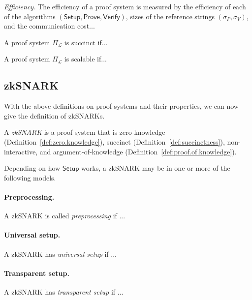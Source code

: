 \documentclass[acmtog]{acmart}
\newcommand{\cL}{\mathcal{L}}
\newcommand{\Setup}{\mathsf{Setup}}
\newcommand{\Prove}{\mathsf{Prove}}
\newcommand{\Verify}{\mathsf{Verify}}
\newcommand{\PiL}{\Pi_{\cL}}
\begin{document}
\emph{Efficiency.} The efficiency of a proof system is measured by the efficiency of each of the algorithms $(\Setup,\Prove,\Verify)$, sizes of the reference strings $(\sigma_P,\sigma_V)$, and the communication cost...

\begin{definition}[Succinctness]
\label{def:succinctness}
A proof system $\PiL$ is succinct if...
\end{definition}

\begin{definition}[Scalability]
\label{def:scalability}
A proof system $\PiL$ is scalable if...
\end{definition}

\subsection{zkSNARK}

With the above definitions on proof systems and their properties, we can now give the definition of zkSNARKs.

\begin{definition}[zkSNARK]
A \emph{zkSNARK} is a proof system that is zero-knowledge (Definition~\ref{def:zero.knowledge}), succinct (Definition~\ref{def:succinctness}), non-interactive, and argument-of-knowledge (Definition~\ref{def:proof.of.knowledge}).
\end{definition}

Depending on how $\Setup$ works, a zkSNARK may be in one or more of the following models.

\paragraph{Preprocessing.} A zkSNARK is called \emph{preprocessing} if ...

\paragraph{Universal setup.} A zkSNARK has \emph{universal setup} if ...

\paragraph{Transparent setup.} A zkSNARK has \emph{transparent setup} if ...
\end{document}
